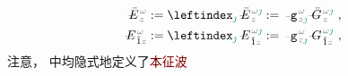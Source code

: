 \begin{subequations} \label{eq:amp_eigenmode}
\begin{align}
	\Xint{\mathcolor{gray}{-}}{30}{\bar{E}}^{\;\!\mathcolor{gray}{\omega}}_{\;\! \mathcolor{gray}{z}} &:= \leftindex_{\textcolor{ForestGreen}{\jmath}} \;\! \Xint{\mathcolor{gray}{-}}{30}{\bar{E}}^{\;\!\mathcolor{gray}{\omega} \textcolor{ForestGreen}{\jmath}}_{\;\! \mathcolor{gray}{z}} := \Xint{\begin{smallmatrix} ~ \\ {}^{}_{\mathcolor{gray}{-}} \\ ~ \end{smallmatrix}}{09}{\mathtt{g}}^{\;\!\mathcolor{gray}{\omega}}_{\;\! \mathcolor{gray}{z} \textcolor{ForestGreen}{\jmath}} \Xint{\mathcolor{gray}{-}}{20}{\bar{G}}^{\;\!\mathcolor{gray}{\omega} \textcolor{ForestGreen}{\jmath}}_{\;\! \mathcolor{gray}{z}} ~, \label{eq:vec-amp_eigenmode} \\
	\Xint{\mathcolor{gray}{-}}{30}{E}^{\;\!\mathcolor{gray}{\omega}}_{\;\! \hat{1} \mathcolor{gray}{z}} &:= \leftindex_{\textcolor{ForestGreen}{\jmath}} \;\! \Xint{\mathcolor{gray}{-}}{30}{E}^{\;\!\mathcolor{gray}{\omega} \textcolor{ForestGreen}{\jmath}}_{\;\! \hat{1} \mathcolor{gray}{z}} := \Xint{\begin{smallmatrix} ~ \\ {}^{}_{\mathcolor{gray}{-}} \\ ~ \end{smallmatrix}}{09}{\mathtt{g}}^{\;\!\mathcolor{gray}{\omega}}_{\;\! \mathcolor{gray}{z} \textcolor{ForestGreen}{\jmath}} \Xint{\mathcolor{gray}{-}}{20}{G}^{\;\!\mathcolor{gray}{\omega} \textcolor{ForestGreen}{\jmath}}_{\;\! \hat{1} \mathcolor{gray}{z}} ~, \label{eq:components-amp_eigenmode}
\end{align}
\end{subequations}
注意， 中均隐式地定义了\textcolor{Maroon}{本征波}
